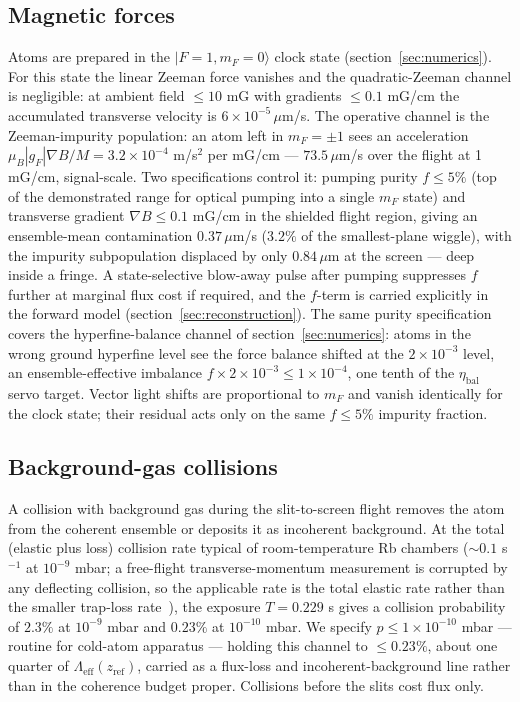 \documentclass[11pt,a4paper]{article}
\newcommand{\ket}[1]{| #1 \rangle}
\begin{document}
\subsection{Magnetic forces}
\label{sec:magnetic}
Atoms are prepared in the $\ket{F{=}1, m_F{=}0}$ clock state (section~\ref{sec:numerics}). For this state the linear Zeeman force vanishes and the quadratic-Zeeman channel is negligible: at ambient field $\leq 10$ mG with gradients $\leq 0.1$ mG/cm the accumulated transverse velocity is $6\times 10^{-5}\,\mu$m/s. The operative channel is the Zeeman-impurity population: an atom left in $m_F = \pm 1$ sees an acceleration $\mu_B|g_F|\nabla B/M = 3.2\times 10^{-4}$ m/s$^2$ per mG/cm --- $73.5\,\mu$m/s over the flight at 1 mG/cm, signal-scale. Two specifications control it: pumping purity $f \leq 5\%$ (top of the demonstrated range for optical pumping into a single $m_F$ state) and transverse gradient $\nabla B \leq 0.1$ mG/cm in the shielded flight region, giving an ensemble-mean contamination $0.37\,\mu$m/s ($3.2\%$ of the smallest-plane wiggle), with the impurity subpopulation displaced by only $0.84\,\mu$m at the screen --- deep inside a fringe. A state-selective blow-away pulse after pumping suppresses $f$ further at marginal flux cost if required, and the $f$-term is carried explicitly in the forward model (section~\ref{sec:reconstruction}). The same purity specification covers the hyperfine-balance channel of section~\ref{sec:numerics}: atoms in the wrong ground hyperfine level see the force balance shifted at the $2\times 10^{-3}$ level, an ensemble-effective imbalance $f\times 2\times 10^{-3} \leq 1\times 10^{-4}$, one tenth of the $\eta_\text{bal}$ servo target. Vector light shifts are proportional to $m_F$ and vanish identically for the clock state; their residual acts only on the same $f \leq 5\%$ impurity fraction.

\subsection{Background-gas collisions}
\label{sec:gas}
A collision with background gas during the slit-to-screen flight removes the atom from the coherent ensemble or deposits it as incoherent background. At the total (elastic plus loss) collision rate typical of room-temperature Rb chambers ($\sim 0.1$ s$^{-1}$ at $10^{-9}$ mbar; a free-flight transverse-momentum measurement is corrupted by any deflecting collision, so the applicable rate is the total elastic rate rather than the smaller trap-loss rate~\cite{Booth2019}), the exposure $T = 0.229$ s gives a collision probability of $2.3\%$ at $10^{-9}$ mbar and $0.23\%$ at $10^{-10}$ mbar. We specify $p \leq 1\times 10^{-10}$ mbar --- routine for cold-atom apparatus --- holding this channel to $\leq 0.23\%$, about one quarter of $\Lambda_\text{eff}(z_\text{ref})$, carried as a flux-loss and incoherent-background line rather than in the coherence budget proper. Collisions before the slits cost flux only.
\end{document}
